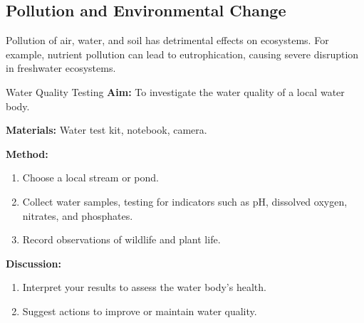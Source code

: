
\subsection{Pollution and Environmental Change}

Pollution of air, water, and soil has detrimental effects on ecosystems. For example, nutrient pollution can lead to eutrophication, causing severe disruption in freshwater ecosystems.

\begin{investigation}{Water Quality Testing}
\textbf{Aim:} To investigate the water quality of a local water body.

\textbf{Materials:} Water test kit, notebook, camera.

\textbf{Method:}
\begin{enumerate}
    \item Choose a local stream or pond.
    \item Collect water samples, testing for indicators such as pH, dissolved oxygen, nitrates, and phosphates.
    \item Record observations of wildlife and plant life.
\end{enumerate}

\textbf{Discussion:}
\begin{enumerate}
    \item Interpret your results to assess the water body's health.
    \item Suggest actions to improve or maintain water quality.
\end{enumerate}
\end{investigation}


